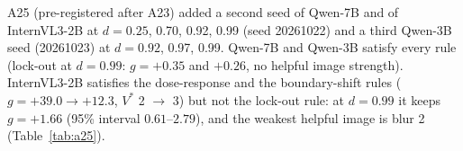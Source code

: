 A25 (pre-registered after A23) added a second seed of Qwen-7B and of InternVL3-2B at $d=0.25$, 0.70, 0.92, 0.99 (seed 20261022) and a third Qwen-3B seed (20261023) at $d=0.92$, 0.97, 0.99.
Qwen-7B and Qwen-3B satisfy every rule (lock-out at $d=0.99$: $g=+0.35$ and $+0.26$, no helpful image strength).
InternVL3-2B satisfies the dose-response and the boundary-shift rules ($g=+39.0\to+12.3$, $V^\ast$ 2 $\to$ 3) but not the lock-out rule: at $d=0.99$ it keeps $g=+1.66$ (95\% interval $0.61$--$2.79$), and the weakest helpful image is blur 2 (Table~\ref{tab:a25}).

\begin{table}[tbp]
  \centering
  \footnotesize
  \setlength{\tabcolsep}{2.4pt}
  \caption{\textbf{A25 runs (A-OKVQA, length shortcut).} Columns as in Table~\ref{tab:a21}.}
  \label{tab:a25}
\end{table}

